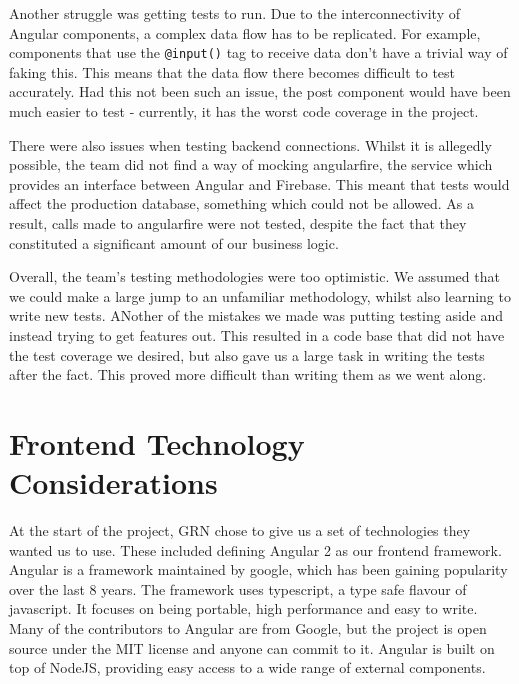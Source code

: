 \documentclass{l3proj}
\begin{document}
Another struggle was getting tests to run. Due to the interconnectivity of
 Angular components, a complex data flow has to be replicated. For example,
 components that use the \texttt{@input()} tag to receive data don't have a
 trivial way of faking this. This means that the data flow there becomes
 difficult to test accurately. Had this not been such an issue, the post
 component would have been much easier to test - currently, it has the worst
 code coverage in the project.

There were also issues when testing backend connections. Whilst it is
 allegedly possible, the team did not find a way of mocking angularfire, the
 service which provides an interface between Angular and Firebase. This meant
 that tests would affect the production database, something which could not be
 allowed. As a result, calls made to angularfire were not tested, despite the
 fact that they constituted a significant amount of our business logic.

Overall, the team's testing methodologies were too optimistic. We assumed that
 we could make a large jump to an unfamiliar methodology, whilst also learning
 to write new tests. ANother of the mistakes we made was putting testing aside
 and instead trying to get features out. This resulted in a code base that did
 not have the test coverage we desired, but also gave us a large task in writing
 the tests after the fact. This proved more difficult than writing them as we
 went along.

 


\newpage
\section{Frontend Technology Considerations}
\label{sec:frontend}

At the start of the project, GRN chose to give us a set of technologies they
 wanted us to use. These included defining Angular 2 as our frontend framework.
 Angular is a framework maintained by google, which has been gaining popularity
 over the last 8 years\cite{angularjsoverview}. The framework uses typescript,
 a type safe flavour of javascript. It focuses on being portable, high performance
 and easy to write\cite{angular_features}. Many of the contributors to Angular are from Google, but
 the project is open source under the MIT license and anyone can commit to
 it\cite{angularjsoverview}. Angular is built on top of NodeJS, providing
 easy access to a wide range of external components.
\end{document}
